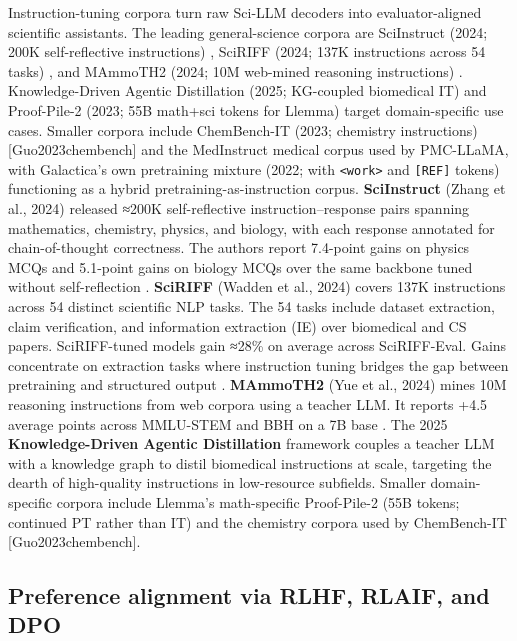 \documentclass{article}
\begin{document}
Instruction-tuning corpora turn raw Sci-LLM decoders into evaluator-aligned scientific assistants. The leading general-science corpora are SciInstruct (2024; 200K self-reflective instructions) \cite{zhang2024sciinstructaselfre}, SciRIFF (2024; 137K instructions across 54 tasks) \cite{wadden2024sciriffaresourceto}, and MAmmoTH2 (2024; 10M web-mined reasoning instructions) \cite{yue2024mammoth2scalingins}. Knowledge-Driven Agentic Distillation (2025; KG-coupled biomedical IT) \cite{xiao2025knowledgedrivenage} and Proof-Pile-2 (2023; 55B math+sci tokens for Llemma) \cite{azerbayev2023llemmaanopenlangua} target domain-specific use cases. Smaller corpora include ChemBench-IT (2023; chemistry instructions) {[}Guo2023chembench{]} and the MedInstruct medical corpus used by PMC-LLaMA, with Galactica's own pretraining mixture (2022; with \texttt{\textless{}work\textgreater{}} and \texttt{{[}REF{]}} tokens) \cite{taylor2022arxiv2211090852022} functioning as a hybrid pretraining-as-instruction corpus. \textbf{SciInstruct} (Zhang et al., 2024) released ≈200K self-reflective instruction--response pairs spanning mathematics, chemistry, physics, and biology, with each response annotated for chain-of-thought correctness. The authors report 7.4-point gains on physics MCQs and 5.1-point gains on biology MCQs over the same backbone tuned without self-reflection \cite{zhang2024sciinstructaselfre}. \textbf{SciRIFF} (Wadden et al., 2024) covers 137K instructions across 54 distinct scientific NLP tasks. The 54 tasks include dataset extraction, claim verification, and information extraction (IE) over biomedical and CS papers. SciRIFF-tuned models gain ≈28\% on average across SciRIFF-Eval. Gains concentrate on extraction tasks where instruction tuning bridges the gap between pretraining and structured output \cite{wadden2024sciriffaresourceto}. \textbf{MAmmoTH2} (Yue et al., 2024) mines 10M reasoning instructions from web corpora using a teacher LLM. It reports +4.5 average points across MMLU-STEM and BBH on a 7B base \cite{yue2024mammoth2scalingins}. The 2025 \textbf{Knowledge-Driven Agentic Distillation} framework \cite{xiao2025knowledgedrivenage} couples a teacher LLM with a knowledge graph to distil biomedical instructions at scale, targeting the dearth of high-quality instructions in low-resource subfields. Smaller domain-specific corpora include Llemma's math-specific Proof-Pile-2 (55B tokens; continued PT rather than IT) \cite{azerbayev2023llemmaanopenlangua} and the chemistry corpora used by ChemBench-IT {[}Guo2023chembench{]}.

\subsection{Preference alignment via RLHF, RLAIF, and DPO}\label{preference-alignment-via-rlhf-rlaif-and-dpo}
\end{document}
